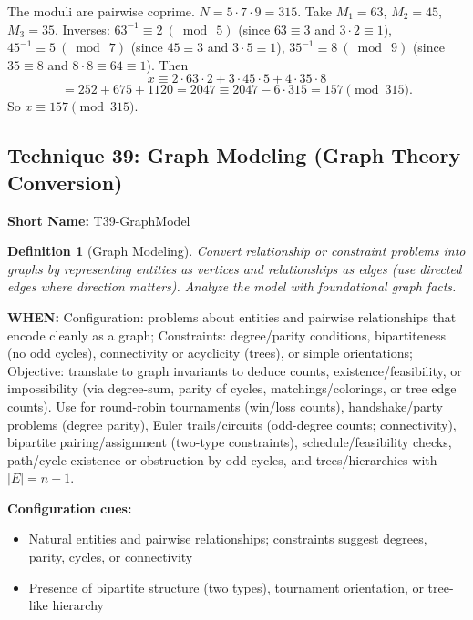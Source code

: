 \documentclass[12pt]{article}
\newtheorem{definition}{Definition}[section]
\newenvironment{solution}
{\begin{tcolorbox}[colback=green!5!white,colframe=green!75!black,title={Solution}]}{\end{tcolorbox}}
\begin{document}
\begin{solution}
The moduli are pairwise coprime. $N = 5\cdot 7\cdot 9 = 315$. Take $M_1=63$, $M_2=45$, $M_3=35$. Inverses: $63^{-1}\equiv 2\ (\bmod\ 5)$ (since $63\equiv 3$ and $3\cdot 2\equiv 1$), $45^{-1}\equiv 5\ (\bmod\ 7)$ (since $45\equiv 3$ and $3\cdot 5\equiv 1$), $35^{-1}\equiv 8\ (\bmod\ 9)$ (since $35\equiv 8$ and $8\cdot 8\equiv 64\equiv 1$). Then
\[
 x \equiv 2\cdot 63\cdot 2 + 3\cdot 45\cdot 5 + 4\cdot 35\cdot 8
\]
\[
  = 252 + 675 + 1120 = 2047 \equiv 2047 - 6\cdot 315 = 157 \pmod{315}.
\]
So $x \equiv 157 \pmod{315}$.
\end{solution}

\subsection{Technique 39: Graph Modeling (Graph Theory Conversion)}
\textbf{Short Name:} T39-GraphModel

\begin{definition}[Graph Modeling]
Convert relationship or constraint problems into graphs by representing entities as vertices and relationships as edges (use directed edges where direction matters). Analyze the model with foundational graph facts.
\end{definition}

\textbf{WHEN:} Configuration: problems about entities and pairwise relationships that encode cleanly as a graph; Constraints: degree/parity conditions, bipartiteness (no odd cycles), connectivity or acyclicity (trees), or simple orientations; Objective: translate to graph invariants to deduce counts, existence/feasibility, or impossibility (via degree-sum, parity of cycles, matchings/colorings, or tree edge counts). Use for round-robin tournaments (win/loss counts), handshake/party problems (degree parity), Euler trails/circuits (odd-degree counts; connectivity), bipartite pairing/assignment (two-type constraints), schedule/feasibility checks, path/cycle existence or obstruction by odd cycles, and trees/hierarchies with $|E|=n-1$.

\textbf{Configuration cues:}
\begin{itemize}
    \item Natural entities and pairwise relationships; constraints suggest degrees, parity, cycles, or connectivity
    \item Presence of bipartite structure (two types), tournament orientation, or tree-like hierarchy
\end{itemize}
\end{document}
